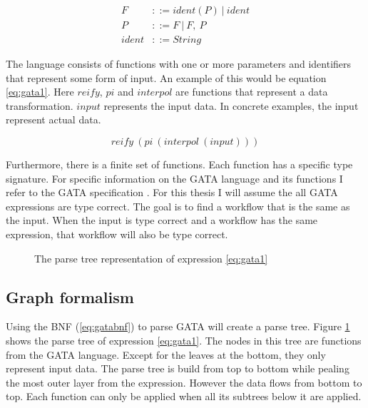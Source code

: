 \documentclass{article}
\begin{document}
\begin{align}
    F &::= ident(P)\ |\ ident  \nonumber \\
    P &::= F\ |\ F,\ P \nonumber \\
    ident &::= String \label{eq:gatabnf}
\end{align}

The language consists of functions with one or more parameters and identifiers that represent some form of input. An example of this would be equation \ref{eq:gata1}. Here $reify$, $pi$ and $interpol$ are functions that represent a data transformation. $input$ represents the input data. In concrete examples, the input represent actual data. 

\begin{equation}
    reify\ (pi\ (interpol\ (input))) \label{eq:gata1}
\end{equation}

Furthermore, there is a finite set of functions. Each function has a specific type signature. For specific information on the GATA language and its functions I refer to the GATA specification \cite{scheider2020gata}. For this thesis I will assume the all GATA expressions are type correct. The goal is to find a workflow that is the same as the input. When the input is type correct and a workflow has the same expression, that workflow will also be type correct. 

\begin{figure}
    \centering
   
    
    \caption{The parse tree representation of expression \ref{eq:gata1}}
    \label{fig:parsetree}
\end{figure}

\subsection{Graph formalism}
Using the BNF (\ref{eq:gatabnf}) to parse GATA will create a parse tree. Figure \ref{fig:parsetree} shows the parse tree of expression \ref{eq:gata1}. The nodes in this tree are functions from the GATA language. Except for the leaves at the bottom, they only represent input data. The parse tree is build from top to bottom while pealing the most outer layer from the expression. However the data flows from bottom to top. Each function can only be applied when all its subtrees below it are applied. 
\\
\end{document}
